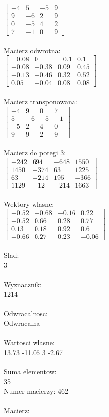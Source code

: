 \documentclass[a4paper,12pt]{article}
\begin{document}
$\begin{bmatrix} -4&5&-5&9\\9&-6&2&9\\0&-5&4&2\\7&-1&0&9 \end{bmatrix}$
\\
\\
Macierz odwrotna:\\

$\begin{bmatrix} -0.08&0&-0.1&0.1\\-0.08&-0.38&0.09&0.45\\-0.13&-0.46&0.32&0.52\\0.05&-0.04&0.08&0.08 \end{bmatrix}$
\\
\\
Macierz transponowana:\\

$\begin{bmatrix} -4&9&0&7\\5&-6&-5&-1\\-5&2&4&0\\9&9&2&9 \end{bmatrix}$
\\
\\
Macierz do potegi 3:\\

$\begin{bmatrix} -242&694&-648&1550\\1450&-374&63&1225\\63&-214&195&-366\\1129&-12&-214&1663 \end{bmatrix}$
\\
\\
Wektory wlasne:\\

$\begin{bmatrix} -0.52&-0.68&-0.16&0.22\\-0.52&0.66&0.28&0.77\\0.13&0.18&0.92&0.6\\-0.66&0.27&0.23&-0.06 \end{bmatrix}$
\\
\\
Slad:\\
3
\\
\\
Wyznacznik:\\
1214
\\
\\
Odwracalnosc:\\
Odwracalna
\\
\\
Wartosci wlasne:\\
13.73 -11.06 3 -2.67
\\
\\
Suma elementow:\\
35
\\
\newpage
Numer macierzy:
462
\\
\\
Macierz:\\
\end{document}
